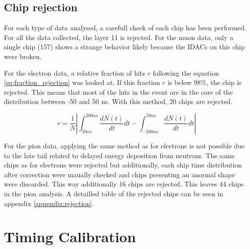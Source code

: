 \subsection{Chip rejection}

For each type of data analysed, a carefull check of each chip has been performed. For all the data collected, the layer 11 is rejected. For the muon data, only a single chip (157) shows a strange behavior likely because the IDACs on this chip were broken.

For the electron data, a relative fraction of hits $r$ following the equation \ref{eq:fraction_rejection} was looked at. If this fraction $r$ is below 98\%, the chip is rejected. This means that most of the hits in the event are in the core of the distribution between -50 and 50 ns. With this method, 20 chips are rejected.

\begin{equation} \label{eq:fraction_rejection}
	r = \frac{1}{N} \left|\int_{50 ns}^{200 ns} \frac{dN(t)}{dt} dt - \int_{-200 ns}^{50 ns} \frac{dN(t)}{dt} dt\right|
\end{equation}

For the pion data, applying the same method as for electrons is not possible due to the late tail related to delayed energy deposition from neutrons. The same chips as for electrons were rejected but additionally, each chip time distribution after correction were maually checked and chips presenting an anormal shape were discarded. This way additionally 16 chips are rejected. This leaves 44 chips in the pion analysis. A detailled table of the rejected chips can be seen in appendix \ref{appendix:rejection}.

\section{Timing Calibration}

\begin{table}[htb!]
	\centering
	\caption{Table with the run statistic before and after selection used for timing calibration.}
	\label{table:mu_elec_runs}
\end{table}

